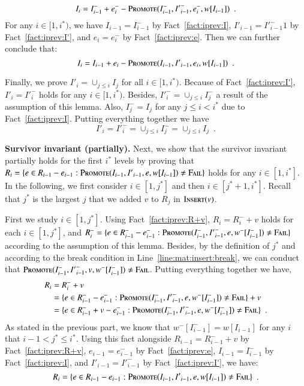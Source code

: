 \documentclass[11pt]{article}
\newcommand{\err}{{\textsc{Fail}}}
\newcommand{\replacementTester}{\textsc{Promote}}
\newcommand{\insertv}{{\textsc{Insert}}}
\begin{document}
$$I_i = I_{i - 1}^- + e_i^- - \replacementTester{}(I_{i - 1}^-, {I'}_{i - 1}^-, e_i^-, w[I_{i - 1}]) \enspace.$$
For any $i\in[1,i^*)$, we have $I_{i - 1}=I_{i - 1}^-$ by Fact~\ref{fact:iprev:I}, ${I'}_{i - 1}={I'}_{i - 1}^-1$ by Fact~\ref{fact:iprev:I'}, and $e_i=e_i^-$ by Fact~\ref{fact:iprev:e}. Then we can further conclude that:
$$
I_i = I_{i - 1} + e_i - \replacementTester{}(I_{i - 1},  {I'}_{i - 1}, e_i, w[I_{i - 1}]) \enspace.
$$

Finally, we prove ${I'}_i = \cup_{j \le i} I_j$ for  all $i \in [1,i^*)$.
Because of Fact~\ref{fact:iprev:I'}, ${I'}_i =  {I'}_i^-$ holds  for any $i\in[1,i^*)$. Besides, ${I'}_i^- = \cup_{j \le i} I_j^-$ a result of the assumption of this lemma.
Also, $I_j^-=I_j$ for any $j\leq i <i^*$ due to Fact~\ref{fact:iprev:I}.
Putting everything together we have
$$
{I'}_i =  {I'}_i^- = \cup_{j \le i} I_j^- = \cup_{j \le i} I_j  \enspace .
$$

\textbf{Survivor invariant (partially). }
Next, we show that the survivor invariant partially holds for the first $i^*$ levels by proving that $R_i=\{ e \in R_{i-1} - e_{i-1}: \replacementTester{}(I_{i-1}, {I'}_{i-1}, e, w[I_{i-1}]) \ne \err\}$ holds for any $i\in[1,i^*]$.
In the following, we first consider $i \in [1, j^*]$ and then $i \in [j^*+1, i^*]$.
Recall that $j^*$ is the largest $j$ that we added $v$ to $R_j$ in $\insertv(v)$.

First we study $i \in [1, j^*]$. 
Using Fact~\ref{fact:iprev:R+v}, $R_i = R_i^- + v$ holds for each $i \in [1, j^*]$, and $R_i^-=\{ e \in R_{i-1}^- - e_{i-1}^-: \replacementTester{}(I_{i-1}^-, {I'}_{i-1}^-, e, w^-[I_{i-1}^-]) \ne \err\}$ according  to the assumption of this lemma. Besides, by the definition of $j^*$  and according to the break condition in Line~\ref{line:mat:insert:break}, we can conduct that $\replacementTester{}(I_{i-1}^-, {I'}_{i-1}^-, v, w^-[I_{i-1}^-]) \ne \err$. Putting everything together we have,
\begin{align*}
    R_i &= R_i^- + v \\
    &= \{ e \in R_{i-1}^- - e_{i-1}^-: \replacementTester{}(I_{i-1}^-, {I'}_{i-1}^-, e, w^-[I_{i-1}^-]) \ne \err\} + v
    \\
    &= \{ e \in R_{i-1}^- + v - e_{i-1}^-: \replacementTester{}(I_{i-1}^-, {I'}_{i-1}^-, e, w^-[I_{i-1}^-]) \ne \err\} \enspace.
\end{align*}
As stated in the previous part, we know that $w^-[I_{i - 1}^-] = w[I_{i - 1}]$ for any $i$ that $i-1< j^*\leq i^*$. 
Using this fact alongside $R_{i-1}=R_{i-1}^- + v$ by Fact~\ref{fact:iprev:R+v}, $e_{i-1}=e_{i-1}^-$ by Fact~\ref{fact:iprev:e}, $I_{i-1}=I_{i-1}^-$ by Fact~\ref{fact:iprev:I}, and ${I'}_{i-1}={I'}_{i-1}^-$ by Fact~\ref{fact:iprev:I'}, we have: 
$$
R_i = \{ e \in R_{i-1} - e_{i-1}: \replacementTester{}(I_{i-1}, {I'}_{i-1}, e, w[I_{i - 1}]) \ne \err\} \enspace.
$$
\end{document}
